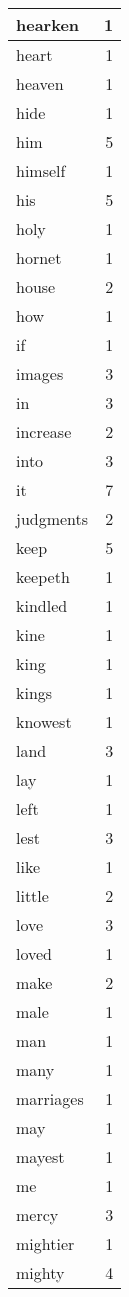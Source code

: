 \begin{center}
\begin{longtable}{l|r}
hearken & 1 \\ \hline
heart & 1 \\ \hline
heaven & 1 \\ \hline
hide & 1 \\ \hline
him & 5 \\ \hline
himself & 1 \\ \hline
his & 5 \\ \hline
holy & 1 \\ \hline
hornet & 1 \\ \hline
house & 2 \\ \hline
how & 1 \\ \hline
if & 1 \\ \hline
images & 3 \\ \hline
in & 3 \\ \hline
increase & 2 \\ \hline
into & 3 \\ \hline
it & 7 \\ \hline
judgments & 2 \\ \hline
keep & 5 \\ \hline
keepeth & 1 \\ \hline
kindled & 1 \\ \hline
kine & 1 \\ \hline
king & 1 \\ \hline
kings & 1 \\ \hline
knowest & 1 \\ \hline
land & 3 \\ \hline
lay & 1 \\ \hline
left & 1 \\ \hline
lest & 3 \\ \hline
like & 1 \\ \hline
little & 2 \\ \hline
love & 3 \\ \hline
loved & 1 \\ \hline
make & 2 \\ \hline
male & 1 \\ \hline
man & 1 \\ \hline
many & 1 \\ \hline
marriages & 1 \\ \hline
may & 1 \\ \hline
mayest & 1 \\ \hline
me & 1 \\ \hline
mercy & 3 \\ \hline
mightier & 1 \\ \hline
mighty & 4 \\ \hline

\end{longtable}
\end{center}
